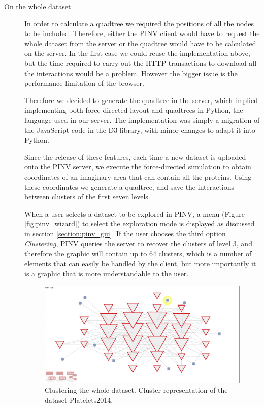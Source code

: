 \begin{description}
\item[On the whole dataset]
In order to calculate a quadtree we required the positions of all the nodes to be included. Therefore, either the PINV client would have to request the whole dataset from the server or the quadtree would have to be calculated on the server. In the first case we could reuse the implementation above, but the time required to carry out the HTTP transactions to download all the interactions would be a problem. However the bigger issue is the performance limitation of the browser.

Therefore we decided to generate the quadtree in the server, which implied implementing both force-directed layout and quadtrees in Python, the language used in our server. The implementation was simply a migration of the JavaScript code in the D3 library, with minor changes to adapt it into Python.

Since the release of these features, each time a new dataset is uploaded onto the PINV server, we execute the force-directed simulation to obtain coordinates of an imaginary area that can contain all the proteins. Using these coordinates we generate a quadtree, and save the interactions between clusters of the first seven levels.

When a user selects a dataset to be explored in PINV, a menu (Figure \ref{fig:pinv_wizard}) to select the exploration mode is displayed as discussed in section \ref{section:pinv_gui}. If the user chooses the third option \emph{Clustering}, PINV queries the server to recover the clusters of level 3, and therefore the graphic will contain up to 64 clusters, which is a number of elements that can easily be handled by the client, but more importantly it is a  graphic that is more understandable to the user.

\begin{figure}[ht]
\centering
\includegraphics[width=\textwidth]{figures/dataset_cluster.png}
\caption[Clustering the whole dataset.]{Clustering the whole dataset. Cluster representation of the dataset Platelets2014.
\label{fig:dataset_cluster}}
\end{figure}


\end{description}
